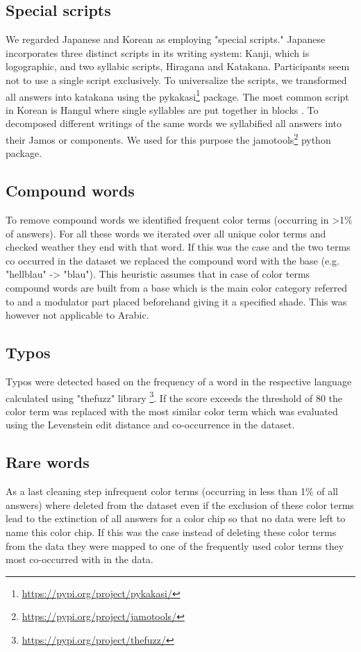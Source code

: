 \subsection{Special scripts}
We regarded Japanese and Korean as employing "special scripts." 
Japanese incorporates three distinct scripts in its writing system: Kanji, which is logographic, and two syllabic scripts, Hiragana and Katakana\parencite{harai2007japanese}.
Participants seem not to use a single script exclusively.
To universalize the scripts, we transformed all answers into katakana using the pykakasi\footnote{\url{https://pypi.org/project/pykakasi/}} package.
The most common script in Korean is Hangul where single syllables are put together in blocks \parencite{pae2018korean}.
To decomposed different writings of the same words we syllabified all answers into their Jamos or components. We used for this purpose the jamotools\footnote{\url{https://pypi.org/project/jamotools/}} python package.

\subsection{Compound words}
To remove compound words we identified frequent color terms (occurring in >1\% of answers).
For all these words we iterated over all unique color terms and checked weather they end with that word. If this was the case and the two terms co occurred in the dataset we replaced the compound word with the base (e.g. "hellblau" -> "blau").
This heuristic assumes that in case of color terms compound words are built from a base which is the main color category referred to and a modulator part placed beforehand giving it a specified shade.
This was however not applicable to Arabic.

\subsection{Typos}
Typos were detected based on the frequency of a word in the respective language calculated using "thefuzz" library \footnote{\url{https://pypi.org/project/thefuzz/}}. If the score exceeds the threshold of 80 the color term was replaced with the most similar color term which was evaluated using the Levenstein edit distance and co-occurrence in the dataset.

\subsection{Rare words}
As a last cleaning step infrequent color terms (occurring in less than 1\% of all answers) where deleted from the dataset even if the exclusion of these color terms lead to the extinction of all answers for a color chip so that no data were left to name this color chip. If this was the case instead of deleting these color terms from the data they were mapped to one of the frequently used color terms they most co-occurred with in the data. 